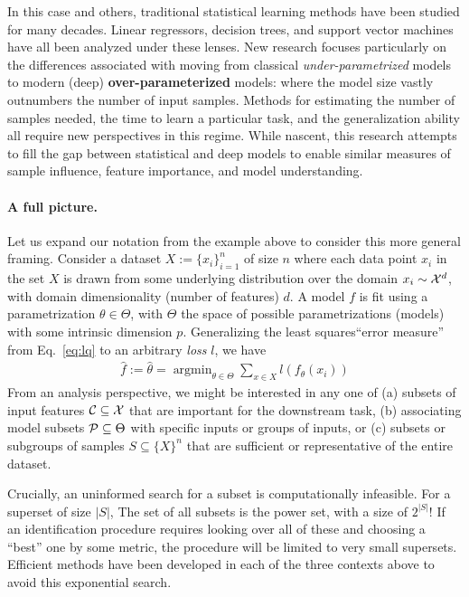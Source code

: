 In this case and others, traditional statistical learning methods 
have been studied 
for many decades.
Linear regressors, decision trees, and support vector machines
have all been analyzed under these lenses.
New research focuses
particularly on the differences
associated with moving from classical \textit{under-parametrized} models to
modern (deep) \textbf{over-parameterized} models: where
the model size vastly outnumbers the number
of input samples.
Methods for estimating the number of samples needed,
the time to learn a particular task,
and the generalization ability 
all require new perspectives in this regime.
While nascent, this research
attempts to fill the gap between
statistical and deep models to enable similar measures of sample influence, feature importance, and model understanding. 

\paragraph{A full picture.}
Let us expand our notation from the example above to consider this more general framing.
Consider a dataset $X:=\{x_i\}_{i=1}^n$ of size $n$ where each data point $x_i$ in the set $X$ is drawn from some underlying distribution over the domain $x_i \sim \mathcal{X}^d$, 
with domain dimensionality (number of features) $d$.
A model $f$ is fit using a parametrization $\theta \in \Theta$,
with $\Theta$ the space of possible parametrizations (models) with some intrinsic dimension $p$. 
Generalizing the least squares``error measure'' from Eq.~\ref{eq:lq} to an arbitrary \textit{loss} $l$, we have
\begin{align}\label{eq:learning}
    \hat{f}:=\hat{\theta} = \mathop{\arg\min}_{\theta\in\Theta} \sum_{x \in X} l(f_\theta(x_i))
\end{align}
From an analysis perspective, 
we might be interested in any one of 
(a) subsets of input features $\mathcal{C} \subseteq \mathcal{X}$ that are important for the downstream task,
(b) associating model subsets $\mathcal{P} \subseteq \Theta$ with specific inputs or groups of inputs, or 
(c) subsets or subgroups of samples $S \subseteq \{X\}^n$ that are sufficient or representative of the entire dataset.

Crucially, an uninformed search for a subset is computationally infeasible. For a superset of size $|S|$, The set of all subsets is the power set, with a size of $2^{|S|}$! If an identification procedure requires looking over all of these and choosing a ``best'' one by some metric, the procedure will be limited to very small supersets.
Efficient methods have been developed in each of the three contexts above to avoid this exponential search.

